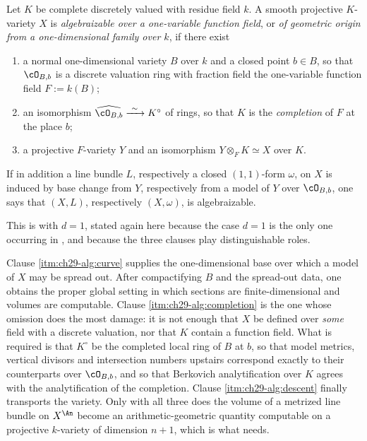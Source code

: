 \begin{definition}
\label{def:ch29-algebraizable}
Let $K$ be complete discretely valued with residue field $k$.  A smooth
projective $K$-variety $X$ is \emph{algebraizable over a one-variable
function field}, or \emph{of geometric origin from a one-dimensional family
over $k$}, if there exist
\begin{enumerate}
\item\label{itm:ch29-alg:curve}
 a normal one-dimensional variety $B$ over $k$ and a closed point
 $b\in B$, so that $\cO_{B,b}$ is a discrete valuation ring with
 fraction field the one-variable function field $F:=k(B)$;
\item\label{itm:ch29-alg:completion}
 an isomorphism $\widehat{\cO_{B,b}}\xrightarrow{\ \sim\ }K^\circ$ of
 rings, so that $K$ is the \emph{completion} of $F$ at the place $b$;
\item\label{itm:ch29-alg:descent}
 a projective $F$-variety $Y$ and an isomorphism
 $Y\otimes_FK\simeq X$ over $K$.
\end{enumerate}
If in addition a line bundle $L$, respectively a closed $(1,1)$-form
$\omega$, on $X$ is induced by base change from $Y$, respectively from
a model of $Y$ over $\cO_{B,b}$, one says that $(X,L)$, respectively
$(X,\omega)$, is algebraizable.
\end{definition}

This is  with $d=1$, stated again here
because the case $d=1$ is the only one occurring in \cite{BFJ15}, and
because the three clauses play distinguishable roles.

\begin{remark}
\label{rem:ch29-algebraizability-clauses}
Clause \cref{itm:ch29-alg:curve} supplies the one-dimensional base over
which a model of $X$ may be spread out.  After compactifying $B$ and the
spread-out data, one obtains the proper global setting in which sections
are finite-dimensional and volumes are computable.  Clause
\cref{itm:ch29-alg:completion} is the one whose omission does the most
damage: it is not enough that $X$ be defined over \emph{some} field with a
discrete valuation, nor that $K$ contain a function field.  What is
required is that $K^\circ$ be the completed local ring of $B$ at $b$,
so that model metrics, vertical divisors and intersection numbers upstairs
correspond exactly to their counterparts over $\cO_{B,b}$, and so that
Berkovich analytification over $K$ agrees with the analytification of the
completion.  Clause \cref{itm:ch29-alg:descent} finally transports the
variety.  Only with all three does the volume of a metrized line bundle on
$X^{\An}$ become an arithmetic-geometric quantity computable on a
projective $k$-variety of dimension $n+1$, which is what
\cite[Appendix~A]{BFJ15} needs.
\end{remark}

